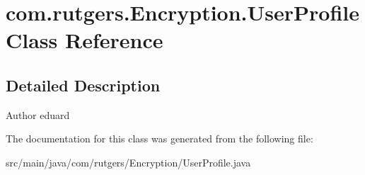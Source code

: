 \hypertarget{classcom_1_1rutgers_1_1Encryption_1_1UserProfile}{}\section{com.\+rutgers.\+Encryption.\+User\+Profile Class Reference}
\label{classcom_1_1rutgers_1_1Encryption_1_1UserProfile}


\subsection{Detailed Description}
\begin{DoxyAuthor}{Author}
eduard 
\end{DoxyAuthor}


The documentation for this class was generated from the following file\+:\begin{DoxyCompactItemize}
\item 
src/main/java/com/rutgers/\+Encryption/User\+Profile.\+java\end{DoxyCompactItemize}

